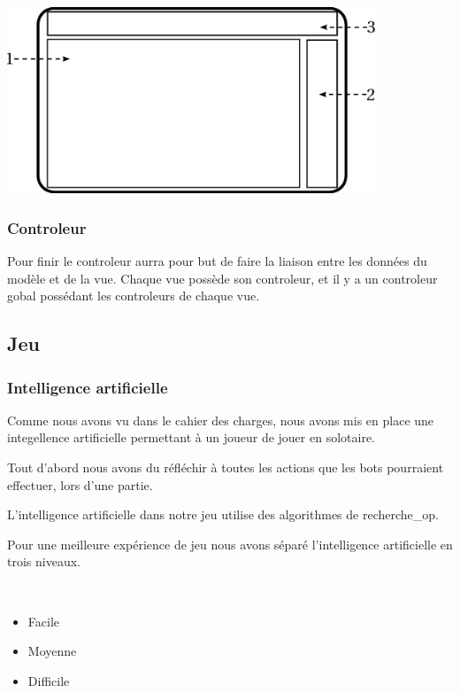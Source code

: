 			\begin{center}
				\includegraphics[width=11cm]{./Analyse/Img/14-Editeur_de_niveau.eps}
			\end{center} 
			
			
	\subsubsection*{Controleur}
		Pour finir le controleur aurra pour but de faire la liaison entre les données du modèle et de la vue. Chaque vue possède son controleur, et il y a un controleur gobal possédant les controleurs de chaque vue.
			

\subsection{Jeu}
	\subsubsection{Intelligence artificielle}
		Comme nous avons vu dans le cahier des charges, nous avons mis en place une integellence artificielle permettant à un joueur de jouer en solotaire.
	
		Tout d'abord nous avons du réfléchir à toutes les actions que les bots pourraient effectuer, lors d'une partie.
		
		
		L'intelligence artificielle dans notre jeu utilise des algorithmes de \gls{recherche_op}.
		
		Pour une meilleure expérience de jeu nous avons séparé l'intelligence artificielle en trois niveaux.
		
		$\,$
		
		\begin{itemize}
		  \item Facile
		  \item Moyenne
		  \item Difficile
		\end{itemize}
		
